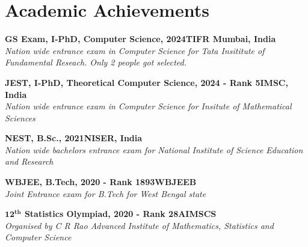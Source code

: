 \documentclass[letterpaper,10pt]{article}
\newcommand{\heading}[2]{
  \hspace{10pt}#1\hfill#2\\
}
\newcommand{\headingBf}[2]{
  \heading{\textbf{#1}}{\textbf{#2}}
}
\newcommand{\headingIt}[2]{
  \heading{\textit{#1}}{\textit{#2}}
}
\newenvironment{resume_list}{
  \vspace{-7pt}
  \begin{itemize}[itemsep=-2px, parsep=1pt, leftmargin=30pt]
}{
  \end{itemize}
}
\begin{document}
\section{Academic Achievements}
\begin{resume_list}
	\item \headingBf{GS Exam, I-PhD, Computer Science, 2024}{TIFR Mumbai, India}
	\headingIt{Nation wide entrance exam in Computer Science for Tata Insititute of Fundamental Reseach. Only 2 people got selected.}{}
	
	\item \headingBf{JEST, I-PhD, Theoretical Computer Science, 2024 - Rank 5}{IMSC, India}
	\headingIt{Nation wide entrance exam in Computer Science for Insitute of Mathematical Sciences}{}
	\item \headingBf{NEST, B.Sc., 2021}{NISER, India}
	\headingIt{Nation wide bachelors entrance exam for National Institute of Science Education and Research }{}
	\item \headingBf{WBJEE, B.Tech, 2020 - Rank 1893}{WBJEEB}
	\headingIt{Joint Entrance exam for B.Tech for West Bengal state}{}
	\item \headingBf{$\boldsymbol{12^{th}}$ Statistics Olympiad, 2020 - Rank 28}{AIMSCS}
	\headingIt{Organised by C R Rao Advanced Institute of Mathematics, Statistics and Computer Science}{}
	
\end{resume_list}
\end{document}
